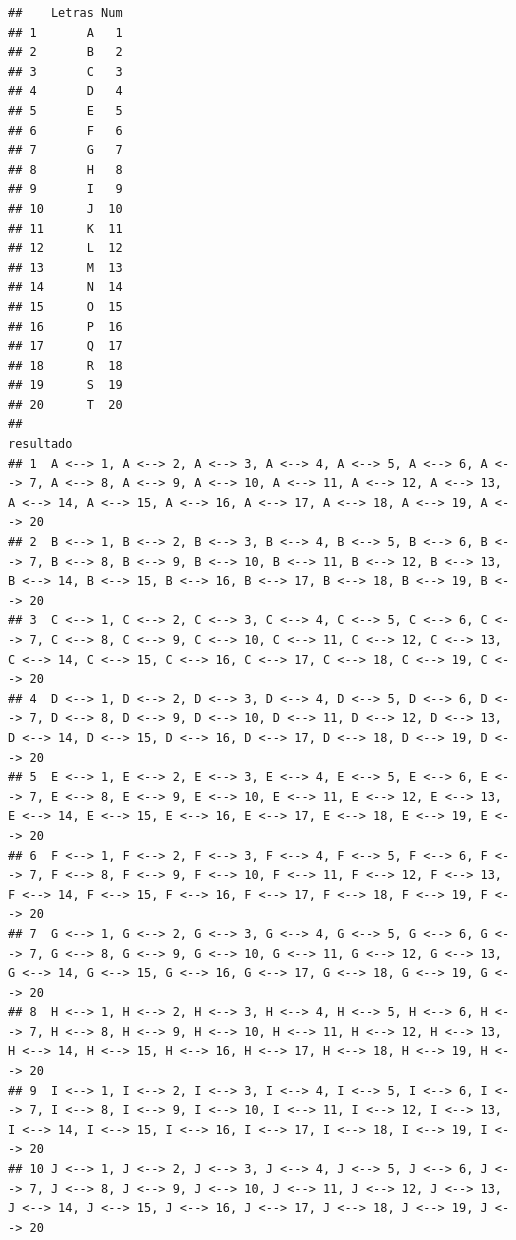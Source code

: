 \documentclass[]{book}
\begin{document}
\begin{verbatim}
##    Letras Num
## 1       A   1
## 2       B   2
## 3       C   3
## 4       D   4
## 5       E   5
## 6       F   6
## 7       G   7
## 8       H   8
## 9       I   9
## 10      J  10
## 11      K  11
## 12      L  12
## 13      M  13
## 14      N  14
## 15      O  15
## 16      P  16
## 17      Q  17
## 18      R  18
## 19      S  19
## 20      T  20
##                                                                                                                                                                                                            resultado
## 1  A <--> 1, A <--> 2, A <--> 3, A <--> 4, A <--> 5, A <--> 6, A <--> 7, A <--> 8, A <--> 9, A <--> 10, A <--> 11, A <--> 12, A <--> 13, A <--> 14, A <--> 15, A <--> 16, A <--> 17, A <--> 18, A <--> 19, A <--> 20
## 2  B <--> 1, B <--> 2, B <--> 3, B <--> 4, B <--> 5, B <--> 6, B <--> 7, B <--> 8, B <--> 9, B <--> 10, B <--> 11, B <--> 12, B <--> 13, B <--> 14, B <--> 15, B <--> 16, B <--> 17, B <--> 18, B <--> 19, B <--> 20
## 3  C <--> 1, C <--> 2, C <--> 3, C <--> 4, C <--> 5, C <--> 6, C <--> 7, C <--> 8, C <--> 9, C <--> 10, C <--> 11, C <--> 12, C <--> 13, C <--> 14, C <--> 15, C <--> 16, C <--> 17, C <--> 18, C <--> 19, C <--> 20
## 4  D <--> 1, D <--> 2, D <--> 3, D <--> 4, D <--> 5, D <--> 6, D <--> 7, D <--> 8, D <--> 9, D <--> 10, D <--> 11, D <--> 12, D <--> 13, D <--> 14, D <--> 15, D <--> 16, D <--> 17, D <--> 18, D <--> 19, D <--> 20
## 5  E <--> 1, E <--> 2, E <--> 3, E <--> 4, E <--> 5, E <--> 6, E <--> 7, E <--> 8, E <--> 9, E <--> 10, E <--> 11, E <--> 12, E <--> 13, E <--> 14, E <--> 15, E <--> 16, E <--> 17, E <--> 18, E <--> 19, E <--> 20
## 6  F <--> 1, F <--> 2, F <--> 3, F <--> 4, F <--> 5, F <--> 6, F <--> 7, F <--> 8, F <--> 9, F <--> 10, F <--> 11, F <--> 12, F <--> 13, F <--> 14, F <--> 15, F <--> 16, F <--> 17, F <--> 18, F <--> 19, F <--> 20
## 7  G <--> 1, G <--> 2, G <--> 3, G <--> 4, G <--> 5, G <--> 6, G <--> 7, G <--> 8, G <--> 9, G <--> 10, G <--> 11, G <--> 12, G <--> 13, G <--> 14, G <--> 15, G <--> 16, G <--> 17, G <--> 18, G <--> 19, G <--> 20
## 8  H <--> 1, H <--> 2, H <--> 3, H <--> 4, H <--> 5, H <--> 6, H <--> 7, H <--> 8, H <--> 9, H <--> 10, H <--> 11, H <--> 12, H <--> 13, H <--> 14, H <--> 15, H <--> 16, H <--> 17, H <--> 18, H <--> 19, H <--> 20
## 9  I <--> 1, I <--> 2, I <--> 3, I <--> 4, I <--> 5, I <--> 6, I <--> 7, I <--> 8, I <--> 9, I <--> 10, I <--> 11, I <--> 12, I <--> 13, I <--> 14, I <--> 15, I <--> 16, I <--> 17, I <--> 18, I <--> 19, I <--> 20
## 10 J <--> 1, J <--> 2, J <--> 3, J <--> 4, J <--> 5, J <--> 6, J <--> 7, J <--> 8, J <--> 9, J <--> 10, J <--> 11, J <--> 12, J <--> 13, J <--> 14, J <--> 15, J <--> 16, J <--> 17, J <--> 18, J <--> 19, J <--> 20

\end{verbatim}
\end{document}
